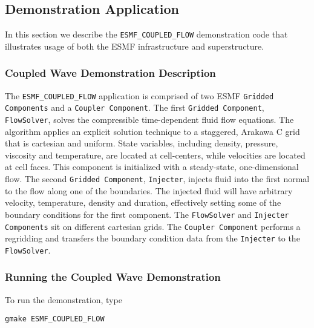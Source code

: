 \subsection{Demonstration Application}
\label{sec:demo}

In this section we describe the {\tt ESMF\_COUPLED\_FLOW} demonstration 
code that illustrates usage of both the ESMF infrastructure and superstructure. 
\subsubsection{Coupled Wave Demonstration Description}

The {\tt ESMF\_COUPLED\_FLOW} application is comprised of two ESMF 
{\tt Gridded Components} and a {\tt Coupler Component}.  
The first {\tt Gridded Component}, {\tt FlowSolver}, solves the compressible 
time-dependent fluid flow equations.  The algorithm 
applies an explicit solution technique to a staggered, Arakawa C grid 
that is cartesian and uniform.  State variables, including density, 
pressure, viscosity and temperature, are located at cell-centers, while 
velocities are located at cell faces.  This component is initialized 
with a steady-state, one-dimensional flow.  The second {\tt Gridded 
Component}, {\tt Injecter}, injects fluid into the first normal to the 
flow along 
one of the boundaries.  The injected fluid will have arbitrary velocity, 
temperature, density and duration, effectively setting some of 
the boundary conditions for the first component.  The {\tt FlowSolver} and 
{\tt Injecter Components} sit on different cartesian grids.  The
{\tt Coupler Component} performs a regridding and transfers the 
boundary condition data from the {\tt Injecter} to the {\tt FlowSolver}.

\subsubsection{Running the Coupled Wave Demonstration}

To run the demonstration, type 

\begin{verbatim}
gmake ESMF_COUPLED_FLOW
\end{verbatim}






























